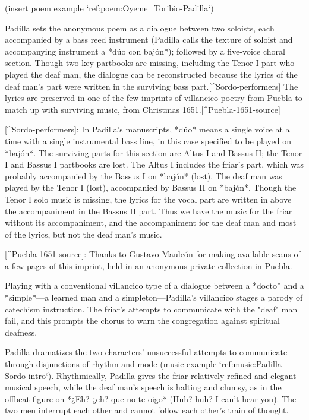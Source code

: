 (insert poem example `ref:poem:Oyeme_Toribio-Padilla`)
\label{poem:Oyeme_Toribio-Padilla}

Padilla sets the anonymous poem as a dialogue between two soloists, each
accompanied by a bass reed instrument (Padilla calls the texture of soloist and
accompanying instrument a *dúo con bajón*); followed by a five-voice choral
section.
Though two key partbooks are missing, including the Tenor I part who played the
deaf man, the dialogue can be reconstructed because the lyrics of the deaf man's
part were written in the surviving bass part.[^Sordo-performers]
The lyrics are preserved in one of the few imprints of villancico poetry from
Puebla to match up with surviving music, from Christmas
1651.[^Puebla-1651-source]

[^Sordo-performers]: 
In Padilla's manuscripts, *dúo* means a single voice at a time with a single
instrumental bass line, in this case specified to be played on *bajón*.
The surviving parts for this section are Altus I and Bassus II; the Tenor I and
Bassus I partbooks are lost.
The Altus I includes the friar's part, which was probably accompanied by the
Bassus I on *bajón* (lost).
The deaf man was played by the Tenor I (lost), accompanied by Bassus II on
*bajón*. 
Though the Tenor I solo music is missing, the lyrics for the vocal part are
written in above the accompaniment in the Bassus II part.
Thus we have the music for the friar without its accompaniment, and the
accompaniment for the deaf man and most of the lyrics, but not the deaf man's
music. 

[^Puebla-1651-source]:
Thanks to Gustavo Mauleón for making available scans of a few pages of this
imprint, held in an anonymous private collection in Puebla.


Playing with a conventional villancico type of a dialogue between a *docto* and
a *simple*---a learned man and a simpleton---Padilla's villancico stages a
parody of catechism instruction. 
The friar's attempts to communicate with the "deaf" man fail, and this prompts
the chorus to warn the congregation against spiritual deafness. 

Padilla dramatizes the two characters' unsuccessful attempts to communicate
through disjunctions of rhythm and mode 
(music example `ref:music:Padilla-Sordo-intro`).
Rhythmically, Padilla gives the friar relatively refined and elegant musical
speech, while the deaf man's speech is halting and clumsy, as in the offbeat
figure on *¿Eh? ¿eh? que no te oigo* (Huh? huh? I can't hear you).
The two men interrupt each other and cannot follow each other's train of
thought.

